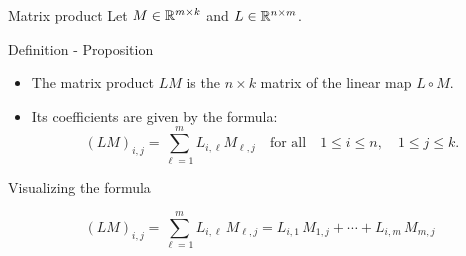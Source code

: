\documentclass{beamer}
\begin{document}
\begin{frame}[t]{Matrix product}
	Let $M \in \mathbb{R}^{m \times k}$ and $L \in \mathbb{R}^{n \times m}$. 
	\vspace{1.7cm}
	\begin{block}{Definition - Proposition}
		\begin{itemize}
			\item The matrix product $LM$ is the $n \times k$ matrix of the linear map $L \circ M$.
				\vspace{0.1cm}
			\item Its coefficients are given by the formula:
		\vspace{-0.2cm}
				$$
				(LM)_{i,j} = \sum_{\ell=1}^m L_{i,\ell} M_{\ell,j} \quad \text{for all} \quad 1 \leq i \leq n, \quad 1 \leq j \leq k.
				$$
		\end{itemize}
		\vspace{-0.4cm}
	\end{block}
\end{frame}
\begin{frame}[t]{Visualizing the formula}
	\vspace{-0.9cm}
	\begin{exampleblock}{}
		\vspace{-0.4cm}
		$$
		(LM)_{i,j} = \sum_{\ell=1}^m L_{i,\ell} \, M_{\ell,j} 
		= L_{i,1} \, M_{1,j} + \cdots + L_{i,m} \, M_{m,j} 
		$$
		\vspace{-0.3cm}
	\end{exampleblock}
\end{frame}
\end{document}
